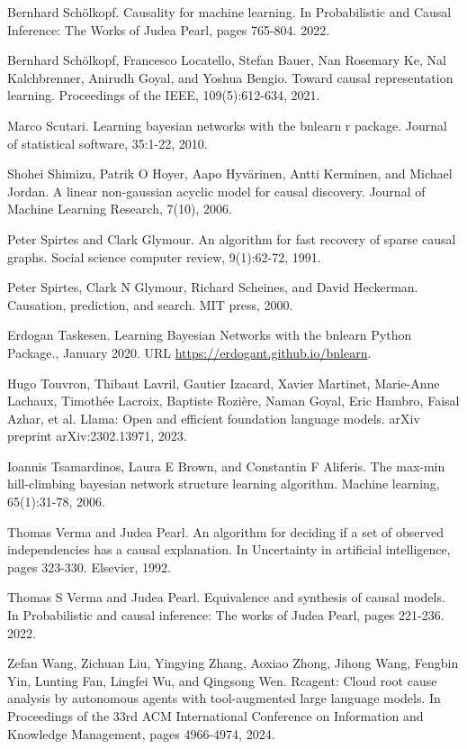 \documentclass[10pt]{article}
\begin{document}
Bernhard Schölkopf. Causality for machine learning. In Probabilistic and Causal Inference: The Works of Judea Pearl, pages 765-804. 2022.

Bernhard Schölkopf, Francesco Locatello, Stefan Bauer, Nan Rosemary Ke, Nal Kalchbrenner, Anirudh Goyal, and Yoshua Bengio. Toward causal representation learning. Proceedings of the IEEE, 109(5):612-634, 2021.

Marco Scutari. Learning bayesian networks with the bnlearn r package. Journal of statistical software, 35:1-22, 2010.

Shohei Shimizu, Patrik O Hoyer, Aapo Hyvärinen, Antti Kerminen, and Michael Jordan. A linear non-gaussian acyclic model for causal discovery. Journal of Machine Learning Research, 7(10), 2006.

Peter Spirtes and Clark Glymour. An algorithm for fast recovery of sparse causal graphs. Social science computer review, 9(1):62-72, 1991.

Peter Spirtes, Clark N Glymour, Richard Scheines, and David Heckerman. Causation, prediction, and search. MIT press, 2000.

Erdogan Taskesen. Learning Bayesian Networks with the bnlearn Python Package., January 2020. URL \href{https://erdogant.github.io/bnlearn}{https://erdogant.github.io/bnlearn}.

Hugo Touvron, Thibaut Lavril, Gautier Izacard, Xavier Martinet, Marie-Anne Lachaux, Timothée Lacroix, Baptiste Rozière, Naman Goyal, Eric Hambro, Faisal Azhar, et al. Llama: Open and efficient foundation language models. arXiv preprint arXiv:2302.13971, 2023.

Ioannis Tsamardinos, Laura E Brown, and Constantin F Aliferis. The max-min hill-climbing bayesian network structure learning algorithm. Machine learning, 65(1):31-78, 2006.

Thomas Verma and Judea Pearl. An algorithm for deciding if a set of observed independencies has a causal explanation. In Uncertainty in artificial intelligence, pages 323-330. Elsevier, 1992.

Thomas S Verma and Judea Pearl. Equivalence and synthesis of causal models. In Probabilistic and causal inference: The works of Judea Pearl, pages 221-236. 2022.

Zefan Wang, Zichuan Liu, Yingying Zhang, Aoxiao Zhong, Jihong Wang, Fengbin Yin, Lunting Fan, Lingfei Wu, and Qingsong Wen. Rcagent: Cloud root cause analysis by autonomous agents with tool-augmented large language models. In Proceedings of the 33rd ACM International Conference on Information and Knowledge Management, pages 4966-4974, 2024.
\end{document}
